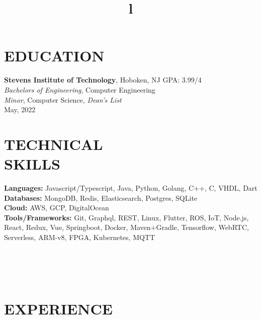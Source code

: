 \documentclass[margin]{res}
\begin{document}
\begin{resume}


\section{EDUCATION}
\textbf{Stevens Institute of Technology}, Hoboken, NJ \hfill GPA: 3.99/4\\
{\sl Bachelors of Engineering}, Computer Engineering\\
{\sl Minor}, Computer Science, {\sl Dean's List}\\
May, 2022

\section{TECHNICAL\\SKILLS}

\textbf{Languages:} Javascript/Typescript, Java, Python, Golang, C++, C, VHDL, Dart
\\
\textbf{Databases:} MongoDB, Redis, Elasticsearch, Postgres, SQLite
\\
\textbf{Cloud:} AWS, GCP, DigitalOcean
\\
\textbf{Tools/Frameworks:} Git, Graphql, REST, Linux, Flutter, ROS, IoT, Node.js,
React, Redux, Vue, Springboot, Docker, Maven+Gradle, Tensorflow,
WebRTC, Serverless, ARM-v8, FPGA, Kubernetes, MQTT

\begin{format}
\title{l}\\
\\
\body\\
\end{format}

\section{EXPERIENCE}


\end{resume}
\end{document}
